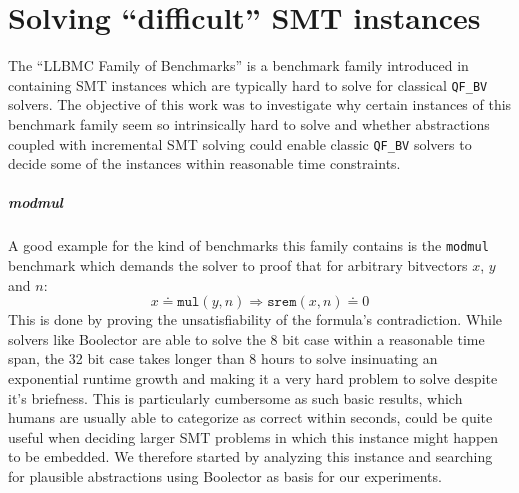 \chapter{Solving \enquote{difficult} SMT instances}
\label{ch:solving_hard_smt}
\label{sec:solving_hard_smt:llbmc_benchmarks}
The \enquote{LLBMC Family of Benchmarks} is a benchmark family introduced in \cite{sc2017-proceedings} containing SMT instances which are typically hard to solve for classical \texttt{QF\_BV} solvers. The objective of this work was to investigate why certain instances of this benchmark family seem so intrinsically hard to solve and whether abstractions coupled with incremental SMT solving could enable classic \texttt{QF\_BV} solvers to decide some of the instances within reasonable time constraints.

\paragraph{modmul}
A good example for the kind of benchmarks this family contains is the \texttt{modmul} benchmark which demands the solver to proof that for arbitrary bitvectors $x$, $y$ and $n$:
\[
x \doteq \texttt{mul}\left(y,n\right) \Rightarrow \texttt{srem}\left(x,n\right) \doteq 0
\]
This is done by proving the unsatisfiability of the formula's contradiction.
While solvers like Boolector are able to solve the 8 bit case within a reasonable time span, the 32 bit case takes longer than 8 hours to solve insinuating an exponential runtime growth and making it a very hard problem to solve despite it's briefness. This is particularly cumbersome as such basic results, which humans are usually able to categorize as correct within seconds, could be quite useful when deciding larger SMT problems in which this instance might happen to be embedded. We therefore started by analyzing this instance and searching for plausible abstractions using Boolector as basis for our experiments.

